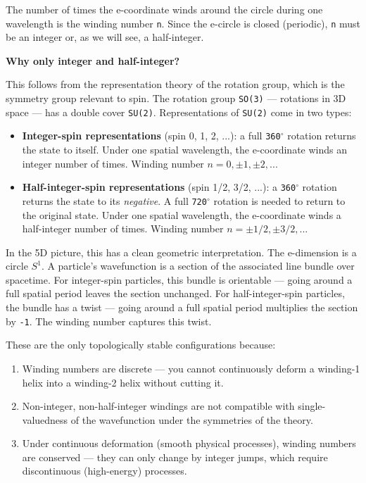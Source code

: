 \documentclass[aps,prd,preprint,superscriptaddress,longbibliography,floatfix]{revtex4-2}
\theoremstyle{remark}
\begin{document}
The number of times the e-coordinate winds around the circle during one wavelength is the winding number \texttt{n}. Since the e-circle is closed (periodic), \texttt{n} must be an integer or, as we will see, a half-integer.

\textbf{Why only integer and half-integer?}

This follows from the representation theory of the rotation group, which is the symmetry group relevant to spin. The rotation group \texttt{SO(3)} --- rotations in 3D space --- has a double cover \texttt{SU(2)}. Representations of \texttt{SU(2)} come in two types:


\begin{itemize}
  \item \textbf{Integer-spin representations} (spin 0, 1, 2, ...): a full \texttt{360$^{\circ}$} rotation returns the state to itself. Under one spatial wavelength, the e-coordinate winds an integer number of times. Winding number $n = 0, \pm1, \pm2, ...$
  \item \textbf{Half-integer-spin representations} (spin 1/2, 3/2, ...): a \texttt{360$^{\circ}$} rotation returns the state to its \textit{negative}. A full \texttt{720$^{\circ}$} rotation is needed to return to the original state. Under one spatial wavelength, the e-coordinate winds a half-integer number of times. Winding number $n = \pm1/2, \pm3/2, ...$
\end{itemize}

In the 5D picture, this has a clean geometric interpretation. The e-dimension is a circle $S^{1}$. A particle's wavefunction is a section of the associated line bundle over spacetime. For integer-spin particles, this bundle is orientable --- going around a full spatial period leaves the section unchanged. For half-integer-spin particles, the bundle has a twist --- going around a full spatial period multiplies the section by \texttt{-1}. The winding number captures this twist.

These are the only topologically stable configurations because:


\begin{enumerate}
  \item Winding numbers are discrete --- you cannot continuously deform a winding-1 helix into a winding-2 helix without cutting it.
  \item Non-integer, non-half-integer windings are not compatible with single-valuedness of the wavefunction under the symmetries of the theory.
  \item Under continuous deformation (smooth physical processes), winding numbers are conserved --- they can only change by integer jumps, which require discontinuous (high-energy) processes.
\end{enumerate}
\end{document}
